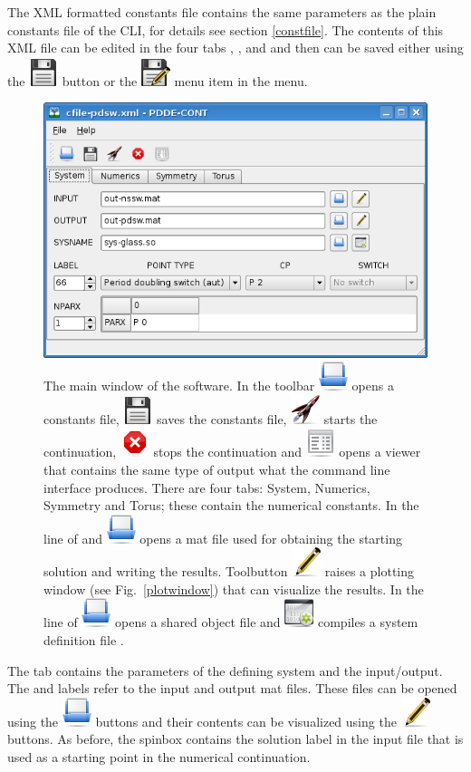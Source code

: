 \documentclass[10pt,a4paper]{ddedoc}
\newcommand{\iconRun}{\protect\includegraphics[height=0.8\baselineskip]{fig/cr32-action-launch}}
\newcommand{\iconStop}{\protect\includegraphics[height=0.8\baselineskip]{fig/cr32-action-stop}}
\newcommand{\iconBuild}{\protect\includegraphics[height=0.8\baselineskip]{fig/cr32-action-build}}
\newcommand{\iconSaveAs}{\protect\includegraphics[height=0.8\baselineskip]{fig/cr32-action-filesaveas}}
\newcommand{\iconPencil}{\protect\includegraphics[height=0.8\baselineskip]{fig/cr32-action-pencil}}
\newcommand{\iconText}{\protect\includegraphics[height=0.8\baselineskip]{fig/cr32-action-view_text}}
\newcommand{\iconOpen}{\protect\includegraphics[height=0.8\baselineskip]{fig/cr32-action-fileopen}}
\newcommand{\iconSave}{\protect\includegraphics[height=0.8\baselineskip]{fig/cr32-action-filesave}}
\begin{document}
The XML formatted constants file contains the same parameters as the
plain constants file of the CLI, for details see section \ref{constfile}. 
The contents of this XML file can be edited in the four tabs ,
,  and  and then can be saved
either using the  \iconSave{} button or the 
\iconSaveAs{} menu item in the  menu.
\begin{figure}[bth!]
\begin{center}
\includegraphics[scale=0.5]{fig/mainwindow}
\caption{The main window of the software. In the toolbar \iconOpen{} opens a constants file, 
\iconSave{} saves the constants file, \iconRun{} starts the continuation, \iconStop{} stops the continuation 
and \iconText{} opens a viewer that contains the same type of output what the command line interface produces. 
There are four tabs: System, Numerics, Symmetry and Torus; these contain the numerical constants. In the line of  
and  \iconOpen{} opens a {\sc{}mat} file used for obtaining the starting solution and writing 
the results. Toolbutton \iconPencil{} raises a plotting window (see Fig.\ \ref{plotwindow}) that can visualize the results.
In the line of  \iconOpen{} opens a  shared object file and \iconBuild{} compiles 
a system definition file  . }
\label{mainwindow}
\end{center}
\end{figure}

The  tab contains the parameters of the defining system and the
input/output. The  and  labels refer to the input and
output {\sc{}mat} files. These files can be opened using the  \iconOpen{}
buttons and their contents can be visualized using the 
\iconPencil{}
buttons. As before, the  spinbox contains the solution label in
the input file that is used as a starting point in the numerical continuation.
\end{document}
